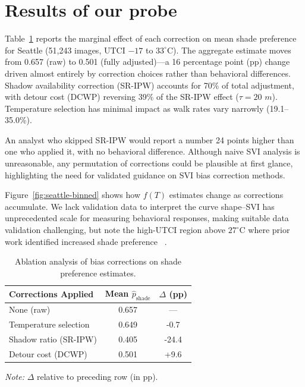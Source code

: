 \documentclass{ifacconf}
\begin{document}
\section{Results of our probe}
  \label{sec:results}

  Table~\ref{tab:ablation} reports the marginal effect of each
  correction on mean shade preference for Seattle (51,243 images,
  UTCI $-17$ to $33^{\circ}\text{C}$). The aggregate estimate moves
  from 0.657 (raw) to 0.501 (fully adjusted)---a 16 percentage point (pp)
  change driven almost entirely by correction choices rather than
  behavioral differences. Shadow availability correction (SR-IPW)
  accounts for 70\% of total adjustment, with detour cost (DCWP)
  reversing 39\% of the SR-IPW effect ($\tau = 20$ $m$). Temperature
  selection has minimal impact as walk rates vary narrowly
  (19.1--35.0\%).

  An analyst who skipped SR-IPW would report a
  number 24 points higher than one who applied it, with no
  behavioral difference. Although naive SVI analysis is
  unreasonable, any permutation of corrections could be plausible at first glance, highlighting the need for validated guidance on SVI
  bias correction methods.

  Figure~\ref{fig:seattle-binned} shows how $f(T)$ estimates change
  as corrections accumulate. We lack validation data to interpret
  the curve shape--SVI has unprecedented scale for measuring behavioral responses, making suitable data validation challenging, but note the high-UTCI region above $27^{\circ}$C
   where prior work identified increased shade
  preference ~\citep{lee2020exploring, melnikov2022behavioural}.

  \begin{table}[t!]
    \centering
    \caption{Ablation analysis of bias corrections on shade
  preference estimates.}
    \label{tab:ablation}
    \small
    \begin{tabular}{@{}lcc@{}}
    \toprule
    \textbf{Corrections Applied} & \textbf{Mean
  $\hat{p}_{\text{shade}}$} & \textbf{$\Delta$ (pp)} \\
    \midrule
    None (raw)                     & 0.657 & ---   \\
    Temperature selection          & 0.649 & -0.7  \\
    Shadow ratio (SR-IPW)          & 0.405 & -24.4  \\
    Detour cost (DCWP)             & 0.501 & +9.6  \\
    \bottomrule
    \end{tabular}
    \vspace{2pt}
    \parbox{0.9\linewidth}{\footnotesize
    \textit{Note:} $\Delta$ relative to preceding row (in pp).
    }
  \end{table}
\end{document}
